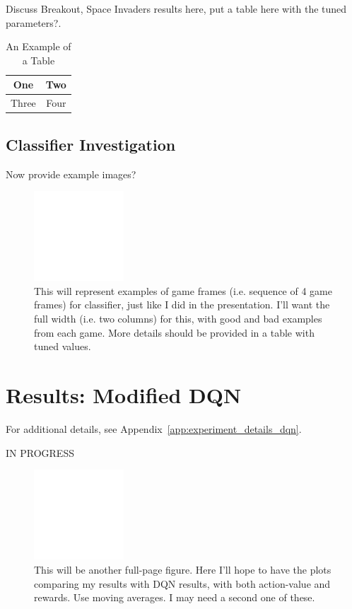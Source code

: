 \documentclass[letterpaper, 10pt, conference]{ieeeconf}
\begin{document}
Discuss Breakout, Space Invaders results here, put a table here with the tuned
parameters?.

\begin{table}[!t]
\renewcommand{\arraystretch}{1.3}
\caption{An Example of a Table}
\label{tab:performance}
\centering
\begin{tabular}{c  c }
\hline
One & Two\\
\hline
Three & Four\\
\hline
\end{tabular}
\end{table}

\subsection{Classifier Investigation}

Now provide example images?

\begin{figure}[t]
\centering
\includegraphics[width=0.30\textwidth]{figures/empty.png}
\caption{\footnotesize
This will represent examples of game frames (i.e. sequence of 4 game frames) for
classifier, just like I did in the presentation. I'll want the full width (i.e.
two columns) for this, with good and bad examples from each game. More details
should be provided in a table with tuned values.
}
\label{fig:empty1}
\end{figure}



\section{Results: Modified DQN}\label{sec:results_p2}

For additional details, see Appendix~\ref{app:experiment_details_dqn}.

IN PROGRESS

\begin{figure}[t]
\centering
\includegraphics[width=0.30\textwidth]{figures/empty.png}
\caption{\footnotesize
This will be another full-page figure. Here I'll hope to have the plots
comparing my results with DQN results, with both action-value and rewards. Use
moving averages. I may need a second one of these.
}
\label{fig:empty2}
\end{figure}
\end{document}
